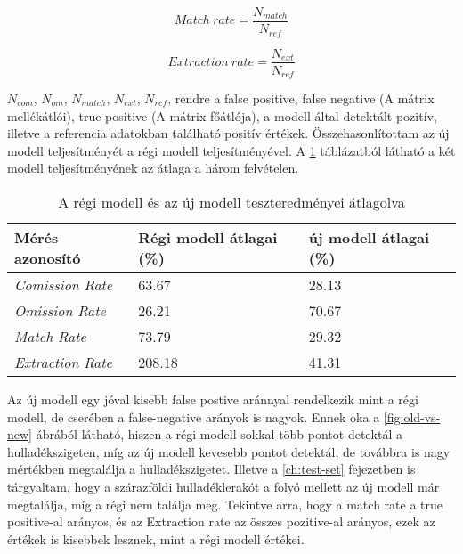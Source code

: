 \begin{equation}\label{eq:match-rate}
    Match \ rate = \frac{N_{match}}{N_{ref}}
\end{equation}

\begin{equation}\label{eq:extraction-rate}
    Extraction \ rate = \frac{N_{ext}}{N_{ref}}
\end{equation}

$N_{com}$, $N_{om}$, $N_{match}$, $N_{ext}$, $N_{ref}$, rendre a false positive, false negative (A mátrix mellékátlói), true positive (A mátrix főátlója), a modell által detektált pozitív, illetve a referencia adatokban található positív értékek. Összehasonlítottam az új modell teljesítményét a régi modell teljesítményével. A \ref{tab:old-vs-new} táblázatból látható a két modell teljesítményének az átlaga a három felvételen.

\begin{table}[H]
	\centering
	\begin{tabular}{ | p{} | p{} | p{} | }
		\hline
		\textbf{Mérés azonosító} & \textbf{Régi modell átlagai (\%)} & \textbf{új modell átlagai (\%)} \\
		\hline \hline
		\emph{Comission Rate} & 63.67 & 28.13 \\
		\hline
		\emph{Omission Rate} & 26.21 & 70.67 \\
		\hline
		\emph{Match Rate} & 73.79 & 29.32 \\
		\hline
        \emph{Extraction Rate} & 208.18 & 41.31 \\
		\hline
	\end{tabular}
	\caption{A régi modell és az új modell teszteredményei átlagolva}
	\label{tab:old-vs-new}
\end{table}

Az új modell egy jóval kisebb false postive aránnyal rendelkezik mint a régi modell, de cserében a false-negative arányok is nagyok. Ennek oka a \ref{fig:old-vs-new} ábrából látható, hiszen a régi modell sokkal több pontot detektál a hulladékszigeten, míg az új modell kevesebb pontot detektál, de továbbra is nagy mértékben megtalálja a hulladékszigetet. Illetve a \ref{ch:test-set} fejezetben is tárgyaltam, hogy a szárazföldi hulladéklerakót a folyó mellett az új modell már megtalálja, míg a régi nem találja meg. Tekintve arra, hogy a match rate a true positive-al arányos, és az Extraction rate az összes pozitive-al arányos, ezek az értékek is kisebbek lesznek, mint a régi modell értékei.

